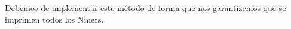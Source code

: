 
\begin{DoxyRefList}
\item[\label{todo__todo000001}%
\hypertarget{todo__todo000001}{}%
Miembro \hyperlink{classNmer_a1ce1c0cb174d94685c7234f58f9dc119}{Nmer\+:\+:list\+\_\+\+Nmer} () const ]Debemos de implementar este método de forma que nos garantizemos que se imprimen todos los Nmers. 
\end{DoxyRefList}